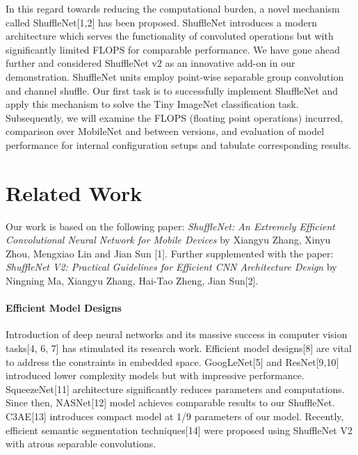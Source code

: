 \documentclass{article}
\begin{document}
In this regard towards reducing the computational burden, a novel mechanism called ShuffleNet[1,2] has been proposed. ShuffleNet introduces a modern architecture which serves the functionality of convoluted operations but with significantly limited FLOPS for comparable performance. We have gone ahead further and considered ShuffleNet v2 as an innovative add-on in our demonstration. ShuffleNet units employ point-wise separable group convolution and channel shuffle. Our first task is to successfully implement ShuffleNet and apply this mechanism to solve the Tiny ImageNet classification task. Subsequently, we will examine the FLOPS (floating point operations) incurred, comparison over MobileNet and between versions, and evaluation of model performance for internal configuration setups and tabulate corresponding results.

\newpage

\section{Related Work}

Our work is based on the following paper: \textit{ShuffleNet: An Extremely Efficient Convolutional Neural Network for Mobile Devices} by Xiangyu Zhang, Xinyu Zhou, Mengxiao Lin and Jian Sun [1]. Further supplemented with the paper: \textit{ShuffleNet V2: Practical Guidelines for Efficient CNN Architecture Design} by Ningning Ma, Xiangyu Zhang, Hai-Tao Zheng, Jian Sun[2].

\paragraph{Efficient Model Designs} Introduction of deep neural networks and its massive success in computer vision tasks[4, 6, 7] has stimulated its research work. Efficient model designs[8] are vital to address the constraints in embedded space. GoogLeNet[5] and ResNet[9,10] introduced lower complexity models but with impressive performance. SqueezeNet[11] architecture significantly reduces parameters and computations. Since then, NASNet[12] model achieves comparable results to our ShuffleNet. C3AE[13] introduces compact model at 1/9 parameters of our model. Recently, efficient semantic segmentation techniques[14] were proposed using ShuffleNet V2 with atrous separable convolutions.
\end{document}
